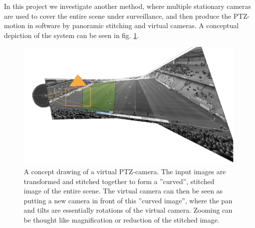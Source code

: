 In this project we investigate another method, where multiple stationary cameras are used to cover the entire scene under surveillance, and then produce the PTZ-motion in software by panoramic stitching and virtual cameras.
A conceptual depiction of the system can be seen in fig. \ref{fig:comp}.

\begin{figure}[H]
	\centering
	\includegraphics[width=0.7\columnwidth]{../results/images/PTZ_comp.png}
	\caption{A concept drawing of a virtual PTZ-camera. The input images are transformed and stitched together to form a ''curved'', stitched image of the entire scene. The virtual camera can then be seen as putting a new camera in front of this ''curved image'', where the pan and tilts are essentially rotations of the virtual camera. Zooming can be thought like magnification or reduction of the stitched image.}
	\label{fig:comp}
\end{figure}
